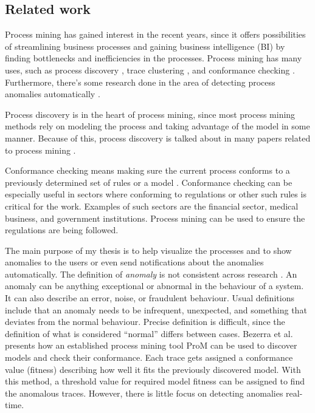 
\subsection{Related work}
\label{sec:relatedwork}

Process mining has gained interest in the recent years, since it offers possibilities of streamlining business processes and gaining business intelligence (BI) by finding bottlenecks and inefficiencies in the processes.
Process mining has many uses, such as process discovery \cite{van2016discovery, van2013discovering}, trace clustering \cite{de2016general}, and conformance checking \cite{chomyat2016process}. Furthermore, there's some research done in the area of detecting process anomalies automatically \cite{bezerra2009anomaly}.

Process discovery is in the heart of process mining, since most process mining methods rely on modeling the process and taking advantage of the model in some manner.
Because of this, process discovery is talked about in many papers related to process mining \cite{chomyat2016process, de2016general, van2013discovering, van2015extracting, van2016process,bezerra2009anomaly}.

Conformance checking means making sure the current process conforms to a previously determined set of rules or a model \cite{chomyat2016process}.
Conformance checking can be especially useful in sectors where conforming to regulations or other such rules is critical for the work.
Examples of such sectors are the financial sector, medical business, and government institutions.
Process mining can be used to ensure the regulations are being followed.

The main purpose of my thesis is to help visualize the processes and to show anomalies to the users or even send notifications about the anomalies automatically.
The definition of \textit{anomaly} is not consistent across research \cite{bezerra2009anomaly}. 
An anomaly can be anything exceptional or abnormal in the behaviour of a system. 
It can also describe an error, noise, or fraudulent behaviour.
Usual definitions include that an anomaly needs to be infrequent, unexpected, and something that deviates from the normal behaviour.
Precise definition is difficult, since the definition of what is considered ``normal'' differs between cases. 
Bezerra et al. \cite{bezerra2009anomaly} presents how an established process mining tool ProM can be used to discover models and check their conformance.
Each trace gets assigned a conformance value (fitness) describing how well it fits the previously discovered model.
With this method, a threshold value for required model fitness can be assigned to find the anomalous traces.
However, there is little focus on detecting anomalies real-time.

